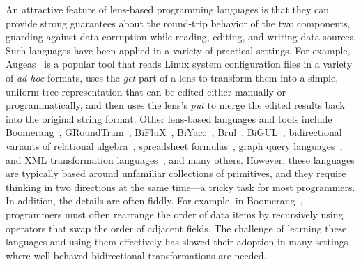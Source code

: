 \documentclass[numbers,10pt,preprint\ifanon ,nocopyrightspace\fi]{sigplanconf}
\begin{document}
An attractive feature of lens-based programming languages is that they can
provide strong guarantees about the round-trip behavior of the two
components, guarding against data corruption while reading,
editing, and writing data sources.  
%
Such languages have been applied in a variety of practical settings.  For
example, Augeas~\cite{augeas} is a popular tool that reads Linux system
configuration files in a variety of {\em ad hoc} formats, uses the
\emph{get} part of a lens to transform them into a simple, uniform tree
representation that can be edited either manually or programmatically, and
then uses the lens's \emph{put} to merge the edited results back into the
original string format.  Other lens-based languages and tools include
%
Boomerang~\cite{boomerang, Matching10}, 
%
GRoundTram~\cite{Hidaka2011GRoundTramAI},
%
BiFluX~\cite{DBLP:conf/ppdp/PachecoZH14}, 
%
BiYacc~\cite{DBLP:conf/staf/ZhuK0SH15},
%
Brul~\cite{DBLP:conf/etaps/ZanLKH16},
%
BiGUL~\cite{DBLP:conf/pepm/KoZH16}, 
%
bidirectional variants of 
relational algebra~\cite{BohannonPierceVaughan},
spreadsheet formulas~\cite{DBLP:conf/vl/MacedoPSC14},
graph query languages~\cite{DBLP:conf/icfp/HidakaHIKMN10},
and
XML transformation languages~\cite{DBLP:conf/pepm/LiuHT07}, 
%
and many others.
%
However, these languages are typically based around unfamiliar collections
of primitives, and they require thinking in two directions at the same
time---a tricky task for most programmers.  In addition, the details are
often fiddly.  For example, in Boomerang~\cite{boomerang, Matching10},
programmers must often rearrange the order of data items by recursively
using operators that swap the order of adjacent fields.  The challenge of
learning these languages and using them effectively has slowed their
adoption in many settings where well-behaved bidirectional transformations
are needed.
\end{document}
